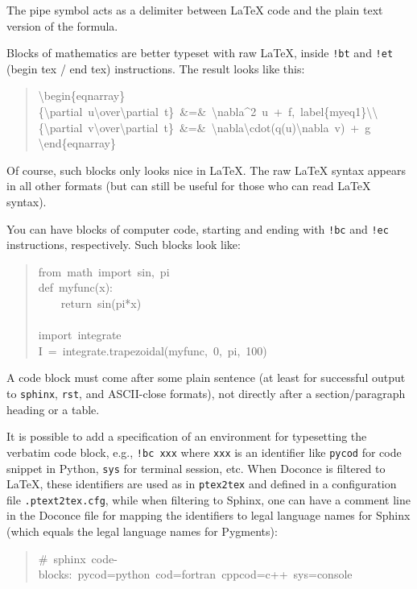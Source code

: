 \documentclass[a4paper]{article}
\begin{document}
The pipe symbol acts as a delimiter between LaTeX code and the plain text
version of the formula.

Blocks of mathematics are better typeset with raw LaTeX, inside
\texttt{!bt} and \texttt{!et} (begin tex / end tex) instructions.
The result looks like this:
%
\begin{quote}{\ttfamily \raggedright \noindent
\textbackslash{}begin\{eqnarray\}\\
\{\textbackslash{}partial~u\textbackslash{}over\textbackslash{}partial~t\}~\&=\&~\textbackslash{}nabla\textasciicircum{}2~u~+~f,~label\{myeq1\}\textbackslash{}\textbackslash{}\\
\{\textbackslash{}partial~v\textbackslash{}over\textbackslash{}partial~t\}~\&=\&~\textbackslash{}nabla\textbackslash{}cdot(q(u)\textbackslash{}nabla~v)~+~g\\
\textbackslash{}end\{eqnarray\}
}
\end{quote}

Of course, such blocks only looks nice in LaTeX. The raw
LaTeX syntax appears in all other formats (but can still be useful
for those who can read LaTeX syntax).

You can have blocks of computer code, starting and ending with
\texttt{!bc} and \texttt{!ec} instructions, respectively. Such blocks look like:
%
\begin{quote}{\ttfamily \raggedright \noindent
from~math~import~sin,~pi\\
def~myfunc(x):\\
~~~~return~sin(pi*x)\\
~\\
import~integrate\\
I~=~integrate.trapezoidal(myfunc,~0,~pi,~100)
}
\end{quote}

A code block must come after some plain sentence (at least for successful
output to \texttt{sphinx}, \texttt{rst}, and ASCII-close formats),
not directly after a section/paragraph heading or a table.

It is possible to add a specification of an
environment for typesetting the verbatim code block, e.g., \texttt{!bc xxx}
where \texttt{xxx} is an identifier like \texttt{pycod} for code snippet in Python,
\texttt{sys} for terminal session, etc. When Doconce is filtered to LaTeX,
these identifiers are used as in \texttt{ptex2tex} and defined in a
configuration file \texttt{.ptext2tex.cfg}, while when filtering
to Sphinx, one can have a comment line in the Doconce file for
mapping the identifiers to legal language names for Sphinx (which equals
the legal language names for Pygments):
%
\begin{quote}{\ttfamily \raggedright \noindent
\#~sphinx~code-blocks:~pycod=python~cod=fortran~cppcod=c++~sys=console
}
\end{quote}
\end{document}
